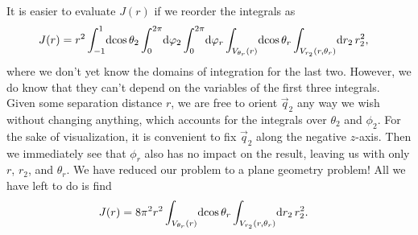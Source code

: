 It is easier to evaluate $J(r)$ if we reorder the integrals as
\begin{align}
	J(r)
	&= r^2 \int_{-1}^1\! \dif \cos{\theta_2} \int_0^{2 \pi}\! \dif \phi_2 \int_0^{2 \pi}\! \dif \phi_r \int_{V_{\theta_r}(r)}\! \dif \cos{\theta_r} \int_{V_{r_2}(r, \theta_r)}\! \dif r_2 \, r_2^2,
\end{align}
where we don't yet know the domains of integration for the last two.
However, we do know that they can't depend on the variables of the first three integrals.
Given some separation distance $r$, we are free to orient $\vec{q}_2$ any way we wish without changing anything, which accounts for the integrals over $\theta_2$ and $\phi_2$.
For the sake of visualization, it is convenient to fix $\vec{q}_2$ along the negative $z$-axis.
Then we immediately see that $\phi_r$ also has no impact on the result, leaving us with only $r$, $r_2$, and $\theta_r$.
We have reduced our problem to a plane geometry problem!
All we have left to do is find
\begin{align}
	J(r)
	&= 8 \pi^2 r^2 \int_{V_{\theta_r}(r)}\! \dif \cos{\theta_r}
		\int_{V_{r_2}(r, \theta_r)}\! \dif r_2 \, r_2^2.
\end{align}

